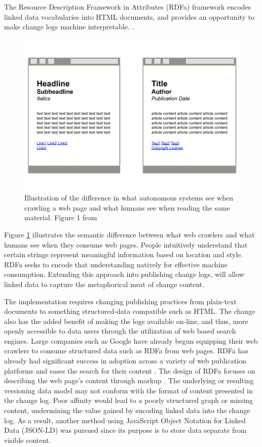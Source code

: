 The Resource Description Framework in Attributes (RDFa) framework encodes linked data vocabularies into HTML documents, and provides an opportunity to make change logs machine interpretable. \cite{Adida2015}.
\begin{figure}
	\centering
	\includegraphics[scale=0.40]{figures/RDFaSemantics.png}
	\caption[Illustration of the difference in what autonomous systems see when crawling a web page and what humans see when reading the same material.]{Illustration of the difference in what autonomous systems see when crawling a web page and what humans see when reading the same material. Figure 1 from \cite{Herman2015}}
	\label{RDFa}
\end{figure}Figure \ref{RDFa} illustrates the semantic difference between what web crawlers and what humans see when they consume web pages.
People intuitively understand that certain strings represent meaningful information based on location and style.
RDFa seeks to encode that understanding natively for effective machine consumption.
Extending this approach into publishing change logs, will allow linked data to capture the metaphorical meat of change content.

The implementation requires changing publishing practices from plain-text documents to something structured-data compatible such as HTML.
The change also has the added benefit of making the logs available on-line, and thus, more openly accessible to data users through the utilization of web based search engines.
Large companies such as Google have already begun equipping their web crawlers to consume structured data such as RDFa from web pages.
RDFa has already had significant success in adoption across a variety of web publication platforms and eases the search for their content \cite{Bizer2013}.
The design of RDFa focuses on describing the web page's content through markup \cite{Herman2015}.
The underlying or resulting versioning data model may not conform with the format of content presented in the change log.
Poor affinity would lead to a poorly structured graph or missing content, undermining the value gained by encoding linked data into the change log.
As a result, another method using JavaScript Object Notation for Linked Data (JSON-LD) was pursued since its purpose is to store data separate from visible content.

